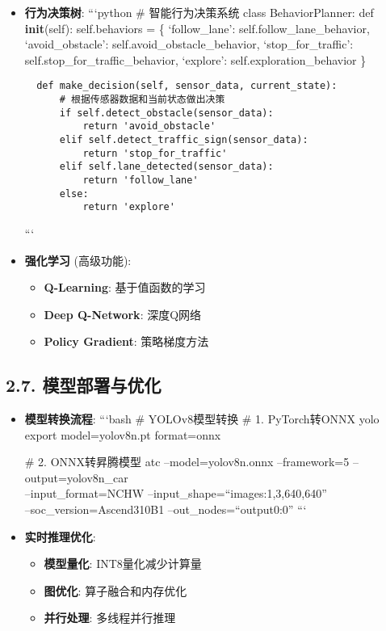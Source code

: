 \begin{itemize}
\item
  \textbf{行为决策树}: ```python \# 智能行为决策系统 class
  BehaviorPlanner: def \textbf{init}(self): self.behaviors = \{
  `follow\_lane': self.follow\_lane\_behavior, `avoid\_obstacle':
  self.avoid\_obstacle\_behavior, `stop\_for\_traffic':
  self.stop\_for\_traffic\_behavior, `explore':
  self.exploration\_behavior \}

\begin{lstlisting}
  def make_decision(self, sensor_data, current_state):
      # 根据传感器数据和当前状态做出决策
      if self.detect_obstacle(sensor_data):
          return 'avoid_obstacle'
      elif self.detect_traffic_sign(sensor_data):
          return 'stop_for_traffic'
      elif self.lane_detected(sensor_data):
          return 'follow_lane'
      else:
          return 'explore'
\end{lstlisting}

  ```
\item
  \textbf{强化学习} (高级功能):

  \begin{itemize}
  \tightlist
  \item
    \textbf{Q-Learning}: 基于值函数的学习
  \item
    \textbf{Deep Q-Network}: 深度Q网络
  \item
    \textbf{Policy Gradient}: 策略梯度方法
  \end{itemize}
\end{itemize}

\subsection{2.7.
模型部署与优化}\label{ux6a21ux578bux90e8ux7f72ux4e0eux4f18ux5316}

\begin{itemize}
\item
  \textbf{模型转换流程}: ```bash \# YOLOv8模型转换 \# 1. PyTorch转ONNX
  yolo export model=yolov8n.pt format=onnx

  \# 2. ONNX转昇腾模型 atc --model=yolov8n.onnx --framework=5
  --output=yolov8n\_car\\
  --input\_format=NCHW --input\_shape=``images:1,3,640,640''\\
  --soc\_version=Ascend310B1 --out\_nodes=``output0:0'' ```
\item
  \textbf{实时推理优化}:

  \begin{itemize}
  \tightlist
  \item
    \textbf{模型量化}: INT8量化减少计算量
  \item
    \textbf{图优化}: 算子融合和内存优化
  \item
    \textbf{并行处理}: 多线程并行推理
  \end{itemize}
\end{itemize}

